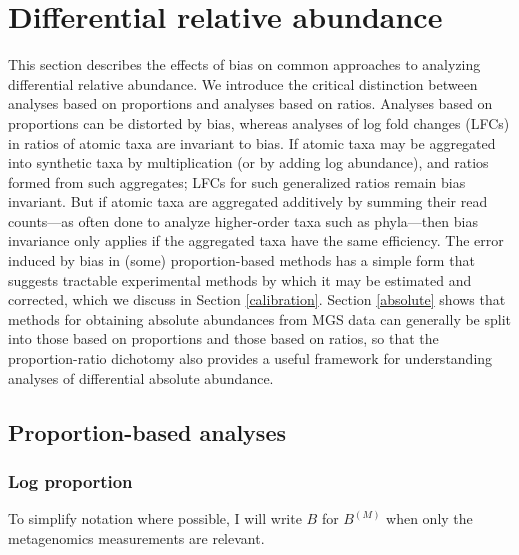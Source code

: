\documentclass[
]{article}
\theoremstyle{definition}
\theoremstyle{definition}
\theoremstyle{definition}
\theoremstyle{definition}
\theoremstyle{remark}
\begin{document}
\hypertarget{relative}{%
\section{Differential relative abundance}\label{relative}}

This section describes the effects of bias on common approaches to analyzing differential relative abundance.
We introduce the critical distinction between analyses based on proportions and analyses based on ratios.
Analyses based on proportions can be distorted by bias, whereas analyses of log fold changes (LFCs) in ratios of atomic taxa are invariant to bias.
If atomic taxa may be aggregated into synthetic taxa by multiplication (or by adding log abundance), and ratios formed from such aggregates; LFCs for such generalized ratios remain bias invariant.
But if atomic taxa are aggregated additively by summing their read counts---as often done to analyze higher-order taxa such as phyla---then bias invariance only applies if the aggregated taxa have the same efficiency.
The error induced by bias in (some) proportion-based methods has a simple form that suggests tractable experimental methods by which it may be estimated and corrected, which we discuss in Section \ref{calibration}.
Section \ref{absolute} shows that methods for obtaining absolute abundances from MGS data can generally be split into those based on proportions and those based on ratios, so that the proportion-ratio dichotomy also provides a useful framework for understanding analyses of differential absolute abundance.

\hypertarget{proportion-based-analyses}{%
\subsection{Proportion-based analyses}\label{proportion-based-analyses}}

\hypertarget{log-proportion}{%
\subsubsection{Log proportion}\label{log-proportion}}

To simplify notation where possible, I will write \(B\) for \(B^{(M)}\) when only the metagenomics measurements are relevant.
\end{document}
